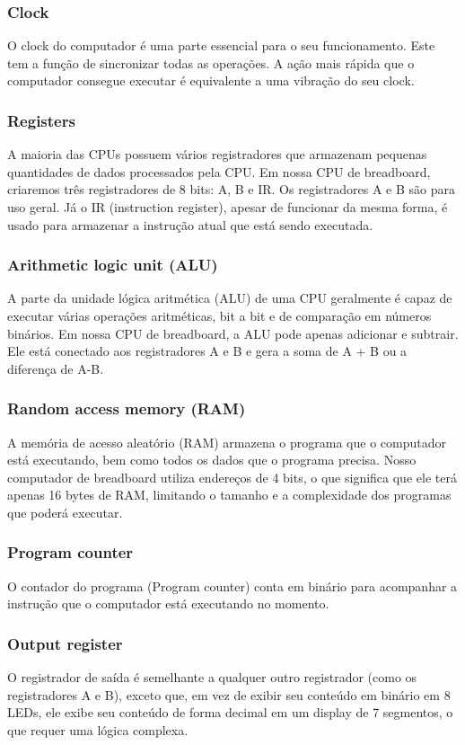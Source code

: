 \subsubsection{Clock}
O clock do computador é uma parte essencial para o seu funcionamento. Este tem a função de sincronizar todas as operações. A ação mais rápida que o computador consegue executar é equivalente a uma vibração do seu clock.

\subsubsection{Registers}
A maioria das CPUs possuem vários registradores que armazenam pequenas quantidades de dados processados pela CPU. Em nossa CPU de breadboard, criaremos três registradores de 8 bits: A, B e IR. Os registradores A e B são para uso geral. Já o IR (instruction register), apesar de funcionar da mesma forma, é usado para armazenar a instrução atual que está sendo executada.

\subsubsection{Arithmetic logic unit (ALU)}
A parte da unidade lógica aritmética (ALU) de uma CPU geralmente é capaz de executar várias operações aritméticas, bit a bit e de comparação em números binários. Em nossa CPU de breadboard, a ALU pode apenas adicionar e subtrair. Ele está conectado aos registradores A e B e gera a soma de A + B ou a diferença de A-B.

\subsubsection{Random access memory (RAM)}
A memória de acesso aleatório (RAM) armazena o programa que o computador está executando, bem como todos os dados que o programa precisa. Nosso computador de breadboard utiliza endereços de 4 bits, o que significa que ele terá apenas 16 bytes de RAM, limitando o tamanho e a complexidade dos programas que poderá executar.

\subsubsection{Program counter}
O contador do programa (Program counter) conta em binário para acompanhar a instrução que o computador está executando no momento.

\subsubsection{Output register}
O registrador de saída é semelhante a qualquer outro registrador (como os registradores A e B), exceto que, em vez de exibir seu conteúdo em binário em 8 LEDs, ele exibe seu conteúdo de forma decimal em um display de 7 segmentos, o que requer uma lógica complexa.


